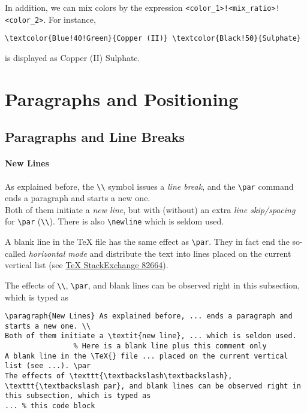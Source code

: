 In addition, we can mix colors by the expression \texttt{<color\_1>!<mix\_ratio>!\allowbreak <color\_2>}. For instance,
\begin{lstlisting}
\textcolor{Blue!40!Green}{Copper (II)} \textcolor{Black!50}{Sulphate}
\end{lstlisting}
is displayed as \textcolor{Blue!40!Green}{Copper (II)} \textcolor{Black!50}{Sulphate}.

\section{Paragraphs and Positioning}

\subsection{Paragraphs and Line Breaks}

\paragraph{New Lines} As explained before, the \texttt{\textbackslash\textbackslash} symbol issues a \textit{line break}, and the \texttt{\textbackslash par} command ends a paragraph and starts a new one. \\
Both of them initiate a \textit{new line}, but with (without) an extra \textit{line skip/spacing} for \texttt{\textbackslash par} (\texttt{\textbackslash\textbackslash}). There is also \texttt{\textbackslash newline} which is seldom used.
    
A blank line in the \TeX{} file has the same effect as \texttt{\textbackslash par}. They in fact end the so-called \textit{horizontal mode} and distribute the text into lines placed on the current vertical list (see \href{https://tex.stackexchange.com/questions/82664/when-to-use-par-and-when-newline-or-blank-lines}{\TeX{} StackExchange 82664}). \par 
The effects of \texttt{\textbackslash\textbackslash}, \texttt{\textbackslash par}, and blank lines can be observed right in this subsection, which is typed as
\begin{lstlisting}
\paragraph{New Lines} As explained before, ... ends a paragraph and starts a new one. \\
Both of them initiate a \textit{new line}, ... which is seldom used.
                % Here is a blank line plus this comment only
A blank line in the \TeX{} file ... placed on the current vertical list (see ...). \par
The effects of \texttt{\textbackslash\textbackslash}, \texttt{\textbackslash par}, and blank lines can be observed right in this subsection, which is typed as
... % this code block
\end{lstlisting}

